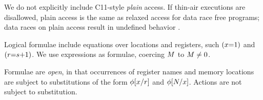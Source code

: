 We do not explicitly include C11-style \emph{plain} access.  If thin-air
executions are disallowed, plain access is the same as relaxed access for
data race free programs; data races on plain access result in undefined
behavior \cite{undefined}.
\begin{comment}
  Thin air example from referee: if (x) y := 1 || if (y) x := 1 .
\end{comment}




Logical formulae include equations over locations and registers, such
$(x{=}1)$ and $(r{=}s{+}1)$.
We use expressions as formulae, coercing $M$ to $M\neq 0$.

Formulae are \emph{open}, in that
occurrences of register names and memory locations are subject to
substitutions of the form $\phi[x/r]$ and $\phi[N/x]$.
Actions are not subject to substitution.



